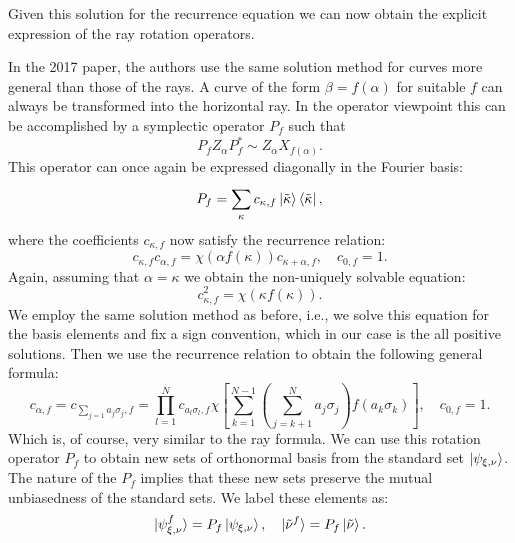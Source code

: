 \documentclass[a4paper]{article}
\begin{document}
  Given this solution for the recurrence equation we can now
  obtain the explicit expression of the ray rotation
  operators.

  In the 2017 paper, the authors use the same solution
  method for curves more general than those of the rays.  A
  curve of the form $\beta = f(\alpha)$ for suitable $f$ can
  always be transformed into the horizontal ray. In the
  operator viewpoint this can be accomplished by a
  symplectic operator $P_f$ such that
  \begin{equation}
    P_f Z_\alpha P_f^* \sim Z_\alpha X_{f(\alpha)}.
  \end{equation}
  This operator can once again be expressed diagonally in
  the Fourier basis:
  \begin{equation}
    P_f = \sum_{\kappa}^{} c_{\kappa,f}
    \ket{\tilde\kappa}\bra{\tilde\kappa},
  \end{equation}
  where the coefficients $c_{\kappa,f}$ now satisfy the
  recurrence relation:
  \begin{equation}
    c_{\kappa,f} c_{\alpha,f}
    = \chi(\alpha f(\kappa)) c_{\kappa+\alpha,f},
    \quad c_{0,f} = 1.
  \end{equation}
  Again, assuming that $\alpha = \kappa$ we obtain the
  non-uniquely solvable equation:
  \begin{equation}
    c_{\kappa,f}^2 = \chi(\kappa f(\kappa)).
  \end{equation}
  We employ the same solution method as before, i.e., we
  solve this equation for the basis elements and fix a sign
  convention, which in our case is the all positive
  solutions. Then we use the recurrence relation to obtain
  the following general formula:
  \begin{equation}
    c_{\alpha,f}
    = c_{\sum_{j=1} a_j \sigma_j, f}
    = \prod_{l=1}^N c_{a_l \sigma_l, f} \chi\left[
    \sum_{k=1}^{N-1} \left(\sum_{j=k+1}^N a_j
    \sigma_j\right) f(a_k \sigma_k) \right],
    \quad c_{0,f} = 1.
  \end{equation}
  Which is, of course, very similar to the ray formula. We
  can use this rotation operator $P_f$ to obtain new sets of
  orthonormal basis from the standard set
  $\ket{\psi_{\xi,\nu}}$. The nature of the $P_f$ implies
  that these new sets preserve the mutual unbiasedness of
  the standard sets. We label these elements as:
  \begin{equation}
    \ket{\psi_{\xi,\nu}^f}
    = P_f \ket{\psi_{\xi,\nu}},
    \quad
    \ket{\tilde\nu^f}
    = P_f \ket{\tilde\nu}.
  \end{equation}
\end{document}
